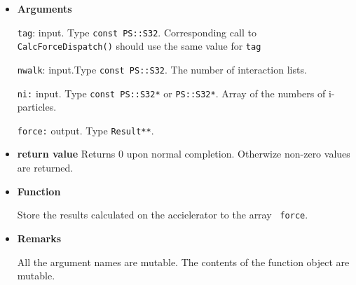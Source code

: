 \begin{itemize}


  
  

  

  

  


\item {\bf Arguments}

  {\tt tag}: input. Type {\tt const PS::S32}. Corresponding call to {\tt
    CalcForceDispatch()} should use the same value for {\tt tag}
  
  {\tt nwalk}: input.Type {\tt const PS::S32}. The number of
  interaction lists. 
  

  {\tt ni:} input. Type {\tt const PS::S32*} or {\tt PS::S32*}. Array
  of the numbers of i-particles.

  {\tt force:} output. Type {\tt Result**}. 
  
\item {\bf return value}
   Returns 0 upon normal completion. Otherwize non-zero values are returned.
  
\item {\bf Function}

  Store the results calculated on the accielerator to the array {\tt
    force}.

\item {\bf Remarks}

    All the argument names are mutable. The contents of the function
  object are mutable.

  
\end{itemize}

